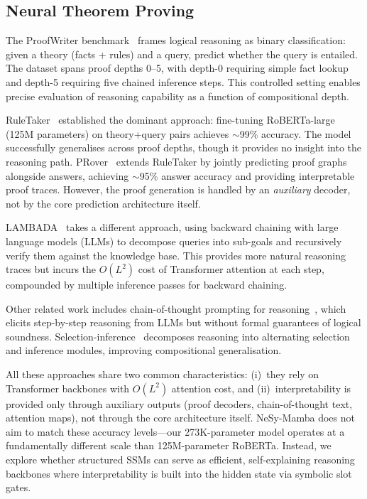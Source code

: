\documentclass[conference]{IEEEtran}
\DeclareRobustCommand{\model}{NeSy-Mamba}
\begin{document}
\subsection{Neural Theorem Proving}

The ProofWriter benchmark~\cite{tafjord2021proofwriter} frames
logical reasoning as binary classification: given a theory (facts
+ rules) and a query, predict whether the query is entailed.
The dataset spans proof depths 0--5, with depth-0 requiring simple
fact lookup and depth-5 requiring five chained inference steps.
This controlled setting enables precise evaluation of reasoning
capability as a function of compositional depth.

RuleTaker~\cite{clark2020ruletaker} established the dominant
approach: fine-tuning RoBERTa-large (125M parameters) on
theory+query pairs achieves $\sim$99\% accuracy.  The model
successfully generalises across proof depths, though it provides
no insight into the reasoning path.
PRover~\cite{saha2020prover} extends RuleTaker by jointly
predicting proof graphs alongside answers, achieving $\sim$95\%
answer accuracy and providing interpretable proof traces.  However,
the proof generation is handled by an \emph{auxiliary} decoder, not
by the core prediction architecture itself.

LAMBADA~\cite{kazemi2023lambada} takes a different approach, using
backward chaining with large language models (LLMs) to decompose
queries into sub-goals and recursively verify them against the
knowledge base.  This provides more natural reasoning traces but
incurs the $O(L^2)$ cost of Transformer attention at each step,
compounded by multiple inference passes for backward chaining.

Other related work includes chain-of-thought prompting for
reasoning~\cite{wei2022chain}, which elicits step-by-step
reasoning from LLMs but without formal guarantees of logical
soundness.  Selection-inference~\cite{creswell2022selection}
decomposes reasoning into alternating selection and inference
modules, improving compositional generalisation.

All these approaches share two common characteristics: (i)~they
rely on Transformer backbones with $O(L^2)$ attention cost, and
(ii)~interpretability is provided only through auxiliary outputs
(proof decoders, chain-of-thought text, attention maps), not
through the core architecture itself.  \model{} does not aim to
match these accuracy levels---our 273K-parameter model operates
at a fundamentally different scale than 125M-parameter
RoBERTa.  Instead, we explore whether structured SSMs can serve
as efficient, self-explaining reasoning backbones where
interpretability is built into the hidden state via symbolic
slot gates.
\end{document}
